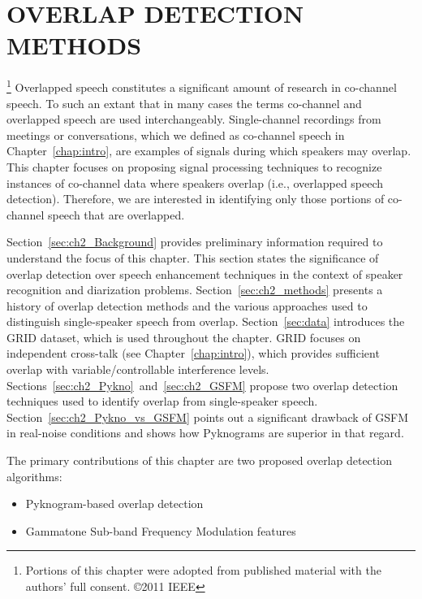 

\chapter{OVERLAP DETECTION METHODS}\thanks{Portions of this chapter were adopted from published material with the authors' full consent. \copyright 2011 IEEE}
\label{chapter:front-end}
Overlapped speech constitutes a significant amount of research in co-channel speech. 
To such an extant that in many cases the terms co-channel and overlapped speech are used interchangeably. Single-channel recordings from meetings or conversations, which we defined as co-channel speech in Chapter~\ref{chap:intro}, are examples of signals during which speakers may overlap. 
This chapter focuses on proposing signal processing techniques to recognize instances of co-channel data where speakers overlap (i.e., overlapped speech detection). Therefore, we are interested in identifying only those portions of co-channel speech that are overlapped. 

Section~\ref{sec:ch2_Background} provides preliminary information required to understand the focus of this chapter. This section states the significance of overlap detection over speech enhancement techniques in the context of speaker recognition and diarization problems. 
Section~\ref{sec:ch2_methods} presents a history of overlap detection methods and the various approaches used to distinguish single-speaker speech from overlap. 
Section~\ref{sec:data} introduces the GRID dataset, which is used throughout the chapter. 
GRID focuses on independent cross-talk (see Chapter~\ref{chap:intro}), which provides sufficient overlap with variable/controllable interference levels. 
Sections~\ref{sec:ch2_Pykno}~and~\ref{sec:ch2_GSFM} propose two overlap detection techniques used to identify overlap from single-speaker speech. 
Section~\ref{sec:ch2_Pykno_vs_GSFM} points out a significant drawback of GSFM in real-noise conditions and shows how Pyknograms are superior in that regard. 

The primary contributions of this chapter are two proposed overlap detection algorithms: 
\begin{itemize}
	\item Pyknogram-based overlap detection
	\item Gammatone Sub-band Frequency Modulation features
\end{itemize}

\newpage
